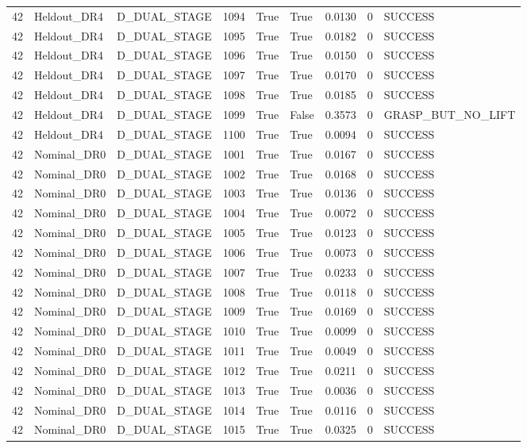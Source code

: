 \documentclass[11pt,a4paper,oneside]{book}
\begin{document}
\begin{longtable}{l l l l l l l l l}
42 & Heldout\_DR4 & D\_DUAL\_STAGE & 1094 & True & True & 0.0130 & 0 & SUCCESS \\
42 & Heldout\_DR4 & D\_DUAL\_STAGE & 1095 & True & True & 0.0182 & 0 & SUCCESS \\
42 & Heldout\_DR4 & D\_DUAL\_STAGE & 1096 & True & True & 0.0150 & 0 & SUCCESS \\
42 & Heldout\_DR4 & D\_DUAL\_STAGE & 1097 & True & True & 0.0170 & 0 & SUCCESS \\
42 & Heldout\_DR4 & D\_DUAL\_STAGE & 1098 & True & True & 0.0185 & 0 & SUCCESS \\
42 & Heldout\_DR4 & D\_DUAL\_STAGE & 1099 & True & False & 0.3573 & 0 & GRASP\_BUT\_NO\_LIFT \\
42 & Heldout\_DR4 & D\_DUAL\_STAGE & 1100 & True & True & 0.0094 & 0 & SUCCESS \\
42 & Nominal\_DR0 & D\_DUAL\_STAGE & 1001 & True & True & 0.0167 & 0 & SUCCESS \\
42 & Nominal\_DR0 & D\_DUAL\_STAGE & 1002 & True & True & 0.0168 & 0 & SUCCESS \\
42 & Nominal\_DR0 & D\_DUAL\_STAGE & 1003 & True & True & 0.0136 & 0 & SUCCESS \\
42 & Nominal\_DR0 & D\_DUAL\_STAGE & 1004 & True & True & 0.0072 & 0 & SUCCESS \\
42 & Nominal\_DR0 & D\_DUAL\_STAGE & 1005 & True & True & 0.0123 & 0 & SUCCESS \\
42 & Nominal\_DR0 & D\_DUAL\_STAGE & 1006 & True & True & 0.0073 & 0 & SUCCESS \\
42 & Nominal\_DR0 & D\_DUAL\_STAGE & 1007 & True & True & 0.0233 & 0 & SUCCESS \\
42 & Nominal\_DR0 & D\_DUAL\_STAGE & 1008 & True & True & 0.0118 & 0 & SUCCESS \\
42 & Nominal\_DR0 & D\_DUAL\_STAGE & 1009 & True & True & 0.0169 & 0 & SUCCESS \\
42 & Nominal\_DR0 & D\_DUAL\_STAGE & 1010 & True & True & 0.0099 & 0 & SUCCESS \\
42 & Nominal\_DR0 & D\_DUAL\_STAGE & 1011 & True & True & 0.0049 & 0 & SUCCESS \\
42 & Nominal\_DR0 & D\_DUAL\_STAGE & 1012 & True & True & 0.0211 & 0 & SUCCESS \\
42 & Nominal\_DR0 & D\_DUAL\_STAGE & 1013 & True & True & 0.0036 & 0 & SUCCESS \\
42 & Nominal\_DR0 & D\_DUAL\_STAGE & 1014 & True & True & 0.0116 & 0 & SUCCESS \\
42 & Nominal\_DR0 & D\_DUAL\_STAGE & 1015 & True & True & 0.0325 & 0 & SUCCESS \\

\end{longtable}
\end{document}
